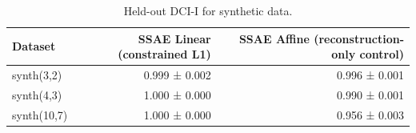 \begin{table}[t]
\centering
\caption{Held-out DCI-I for synthetic data.}
\label{tab:synthetic-dci-i}
\begin{tabular}{lrr}
\toprule
Dataset & SSAE Linear (constrained L1) & SSAE Affine (reconstruction-only control) \\
\midrule
synth(3,2) & 0.999 ± 0.002 & 0.996 ± 0.001 \\
synth(4,3) & 1.000 ± 0.000 & 0.990 ± 0.001 \\
synth(10,7) & 1.000 ± 0.000 & 0.956 ± 0.003 \\
\bottomrule
\end{tabular}
\end{table}

